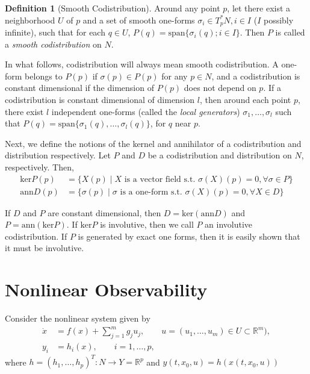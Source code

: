 \documentclass[psamsfonts]{amsart}
\theoremstyle{definition}
\newtheorem{defn}[thm]{Definition}
\theoremstyle{remark}
\newcommand*\R{\mathds{R}}
\numberwithin{equation}{section}
\begin{document}
\begin{defn}[Smooth Codistribution]
Around any point $p$, let there exist a neighborhood $U$ of $p$ and a set of smooth one-forms $\sigma_i \in T^*_pN, i\in I$ ($I$ possibly infinite), such that for each $q \in U$, $P(q) = \text{span}\{\sigma_i(q); i \in I\}$. Then $P$ is called a \textit{smooth codistribution }on $N$. 
\end{defn}

In what follows, codistribution will always mean smooth codistribution. A one-form belongs to $P(p)$ if $\sigma(p) \in P(p)$ for any $p\in N$, and a codistribution is constant dimensional if the dimension of $P(p)$ does not depend on $p$. If a codistribution is constant dimensional of dimension $l$, then around each point $p$, there exist $l$ independent one-forms (called the \textit{local generators}) $\sigma_1, \dots, \sigma_l$ such that $P(q) = \text{span}\{\sigma_1(q), \dots, \sigma_l(q)\}$, for $q$ near $p$. 

Next, we define the notions of the kernel and annihilator of a codistribution and distribution respectively. Let $P$ and $D$ be a codistribution and distribution on $N$, respectively. Then, 
\begin{equation}
    \begin{aligned}
        \text{ker}P(p) &={} \{X(p) \mid X \text{ is a vector field s.t. } \sigma(X)(p) = 0, \forall \sigma \in P\}\\
        \text{ann}D(p) &={} \{\sigma(p) \mid \sigma \text{ is a one-form s.t. } \sigma(X)(p) = 0, \forall X \in D\}
    \end{aligned}   
\end{equation}

If $D$ and $P$ are constant dimensional, then $D = \text{ker}( \text{ann} D)$ and $P = \text{ann}(\text{ker} P)$. If $\text{ker} P$ is involutive, then we call $P$ an involutive codistribution. If $P$ is generated by exact one forms, then it is easily shown that it must be involutive. 


\section{Nonlinear Observability}
Consider the nonlinear system given by 
\begin{equation}
    \begin{aligned}
        \dot x & = {} f(x) + \sum_{j = 1}^m g_j u_j, \qquad u = (u_1, \dots, u_m) \in U\subset \R^m), \\
        y_i & = {} h_i(x), \qquad i = 1, \dots, p,
    \end{aligned}\label{eq:system}
\end{equation}
where $h = (h_1, \dots, h_p)^T:N\rightarrow Y=\R^p$ and $y(t, x_0, u) = h(x(t, x_0, u))$
\end{document}
